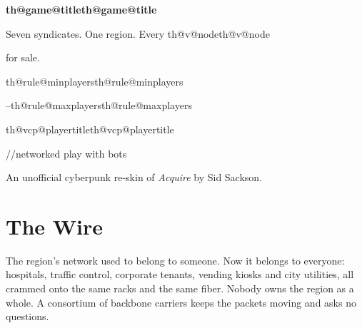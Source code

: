 \documentclass[11pt,letterpaper]{article}
\makeatletter
\newcommand{\th@get}[1]{\ifcsname #1\endcsname\csname #1\endcsname\else
  \PackageError{theme}{Unknown theme key '#1'}{Check theme/theme.toml}\fi}
\newcommand{\Game}[1]{\th@get{th@game@#1}}
\newcommand{\Rule}[1]{\th@get{th@rule@#1}}
\newcommand{\V}[1]{\th@get{th@v@#1}}
\newcommand{\VCp}[1]{\th@get{th@vcp@#1}}
\makeatother
\begin{document}
\begin{titlepage}
\pagecolor{ink}\color{white}
\centering
\vspace*{1.2in}
{\fontsize{46}{50}\selectfont\bfseries\ttfamily\color{neon} \Game{title}\par}
\vspace{0.25in}
{\Large\color{hot}\par}
\vspace{0.5in}
\vspace{0.5in}

{\large Seven syndicates. One region. Every \V{node} for sale.\par}
\vspace{0.15in}
{\color{spike} \Rule{minplayers}--\Rule{maxplayers} \VCp{playertitle} \quad//\quad networked play with bots\par}
\vfill
{\small\color{spike} An unofficial cyberpunk re-skin of \emph{Acquire} by Sid Sackson.\par}
\end{titlepage}
\nopagecolor\color{ink}

\section{The Wire}
The region's network used to belong to someone. Now it belongs to everyone: hospitals, traffic control,
corporate tenants, vending kiosks and city utilities, all crammed onto the same racks and the same fiber.
Nobody owns the region as a whole. A consortium of backbone carriers keeps the packets moving and asks no
questions.
\end{document}
